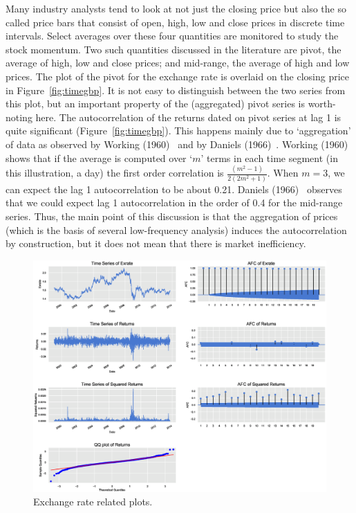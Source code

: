 Many industry analysts tend to look at not just the closing price but also the so called price bars that consist of open, high, low and close prices in discrete time intervals. Select averages over these four quantities are monitored to study the stock momentum. Two such quantities discussed in the literature are pivot, the average of high, low and close prices; and mid-range, the average of high and low prices. The plot of the pivot for the exchange rate is overlaid on the closing price in Figure~\ref{fig:timegbp}. It is not easy to distinguish between the two series from this plot, but an important property of the (aggregated) pivot series is worth-noting here. The autocorrelation of the returns dated on pivot series at lag 1 is quite significant (Figure~\ref{fig:timegbp}). This happens mainly due to `aggregation' of data as observed by Working (1960)~\cite{working1960note} and by Daniels (1966)~\cite{daniels1966autocorrelation}. Working (1960)~\cite{working1960note} shows that if the average is computed over `$m$' terms in each time segment (in this illustration, a day) the first order correlation is $\frac{(m^2-1)}{2(2m^2+1)}$. When $m= 3$, we can expect the lag 1 autocorrelation to be about 0.21. Daniels (1966)~\cite{daniels1966autocorrelation} observes that we could expect lag 1 autocorrelation in the order of 0.4 for the mid-range series. Thus, the main point of this discussion is that the aggregation of prices (which is the basis of several low-frequency analysis) induces the autocorrelation by construction, but it does not mean that there is market inefficiency.
	\begin{figure}[!ht]
	\centering
	\includegraphics[width=\textwidth]{chapters/chapter_uvts/figures/31graphs.eps}
	\caption{Exchange rate related plots. \label{fig:exchrate}}
	\end{figure}

